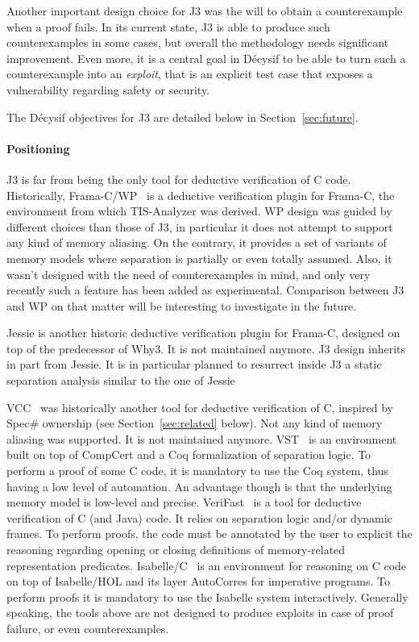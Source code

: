 \documentclass[a4paper,11pt]{article}
\begin{document}
Another important design choice for J3 was the will to obtain a counterexample
when a proof fails. In its current state, J3 is able to produce such
counterexamples in some cases, but overall the methodology needs significant
improvement. Even more, it is a central goal in Décysif to be able to turn such
a counterexample into an \emph{exploit}, that is an explicit test case that
exposes a vulnerability regarding safety or security.

The Décysif objectives for J3 are detailed below in Section~\ref{sec:future}.

\paragraph{Positioning}

J3 is far from being the only tool for deductive verification of C
code. Historically, Frama-C/WP~\cite{blanchard2024wp} is a deductive
verification plugin for Frama-C, the environment from which TIS-Analyzer was
derived. WP design was guided by different choices than those of J3, in
particular it does not attempt to support any kind of memory aliasing. On the
contrary, it provides a set of variants of memory models where separation is
partially or even totally assumed. Also, it wasn't designed with the need of
counterexamples in mind, and only very recently such a feature has been added as
experimental. Comparison between J3 and WP on that matter will be interesting to
investigate in the future.

Jessie is another historic deductive verification plugin for Frama-C, designed
on top of the predecessor of Why3. It is not maintained anymore. J3 design
inherits in part from Jessie. It is in particular planned to resurrect inside J3 a
static separation analysis similar to the one of
Jessie~\cite{hubert2008these,hubert07hav}

VCC~\cite{dahlweid09icse} was historically another tool for deductive
verification of C, inspired by Spec\# ownership (see Section~\ref{sec:related}
below). Not any kind of memory aliasing was supported. It is not maintained
anymore.
%
VST~\cite{appel11esop} is an environment built on top of CompCert and a Coq
formalization of separation logic. To perform a proof of some C code, it is
mandatory to use the Coq system, thus having a low level of automation. An
advantage though is that the underlying memory model is low-level and precise.
%
\mbox{VeriFast}~\cite{jacobs11nfm} is a tool for deductive verification of C (and Java)
code. It relies on separation logic and/or dynamic frames. To perform proofs,
the code must be annotated by the user to explicit the reasoning regarding
opening or closing definitions of memory-related representation predicates.
%
Isabelle/C~\cite{tuong19fide} is an environment for reasoning on C code on top
of Isabelle/HOL and its layer AutoCorres for imperative programs. To perform
proofs it is mandatory to use the Isabelle system interactively.
%
Generally speaking, the tools above are not designed to produce exploits in case of
proof failure, or even counterexamples.
\end{document}
